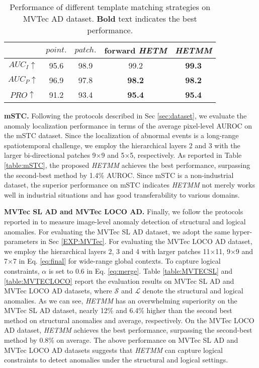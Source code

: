 \documentclass[default,iicol]{sn-jnl}\usepackage[algo2e,ruled,linesnumbered]{algorithm2e}
\theoremstyle{thmstyleone}\newtheorem{theorem}{Theorem}\newtheorem{proposition}[theorem]{Proposition}
\theoremstyle{thmstyletwo}\newtheorem{example}{Example}\newtheorem{remark}{Remark}
\theoremstyle{thmstylethree}\newtheorem{definition}{Definition}
\begin{document}
\begin{table}[!t]
    \caption{
        Performance of different template matching strategies on MVTec AD dataset.
        \textbf{Bold} text indicates the best performance. 
    }
    \centering
    \label{table:RTMM}
    \begin{tabular}{c|cc|cc}
    \hline
                         &$point.$        &$patch.$        &forward \textit{HETM}   &\textit{HETMM}\\\hline        
    $AUC_{I}\uparrow$    &95.6            &98.9            &99.2           &\textbf{99.3}\\
    $AUC_{P}\uparrow$    &96.9            &97.8            &\textbf{98.2}  &\textbf{98.2}\\
    $PRO\uparrow$        &91.2            &93.4            &\textbf{95.4}           &\textbf{95.4}\\
    \hline
    \end{tabular}
\end{table}

\noindent\textbf{mSTC. }
Following the protocols described in Sec \ref{sec:dataset}, we evaluate the anomaly localization performance in terms of the average pixel-level AUROC on the mSTC dataset.
Since the localization of abnormal events is a long-range spatiotemporal challenge, we employ the hierarchical layers 2 and 3 with the larger bi-directional patches 9$\times$9 and 5$\times$5, respectively.
As reported in Table \ref{table:mSTC}, the proposed \textit{HETMM} achieves the best performance, surpassing the second-best method by 1.4\% AUROC.
Since mSTC is a non-industrial dataset, the superior performance on mSTC indicates \textit{HETMM} not merely works well in industrial situations and has good transferability to various domains.

\noindent\textbf{MVTec SL AD and MVTec LOCO AD. }
Finally, we follow the protocols reported in \cite{MVTECLOCO} to measure image-level anomaly detection of structural and logical anomalies.
For evaluating the MVTec SL AD dataset, we adopt the same hyper-parameters in Sec \ref{EXP:MVTec}.
For evaluating the MVTec LOCO AD dataset, we employ the hierarchical layers 2, 3 and 4 with larger patches 11$\times$11, 9$\times$9 and 7$\times$7 in Eq. \ref{eq:final} for wide-range global contexts.
To capture logical constraints, $\alpha$ is set to $0.6$ in Eq. \ref{eq:merge}.
Table \ref{table:MVTECSL} and \ref{table:MVTECLOCO} report the evaluation results on MVTec SL AD and MVTec LOCO AD datasets, where $\mathcal{S}$ and $\mathcal{L}$ denote the structural and logical anomalies.
As we can see, \textit{HETMM} has an overwhelming superiority on the MVTec SL AD dataset, nearly 12\% and 6.4\% higher than the second best method on structural anomalies and average, respectively.
On the MVTec LOCO AD dataset, \textit{HETMM} achieves the best performance, surpassing the second-best method by 0.8\% on average.
The above performance on MVTec SL AD and MVTec LOCO AD datasets suggests that \textit{HETMM} can capture logical constraints to detect anomalies under the structural and logical settings.
\end{document}
